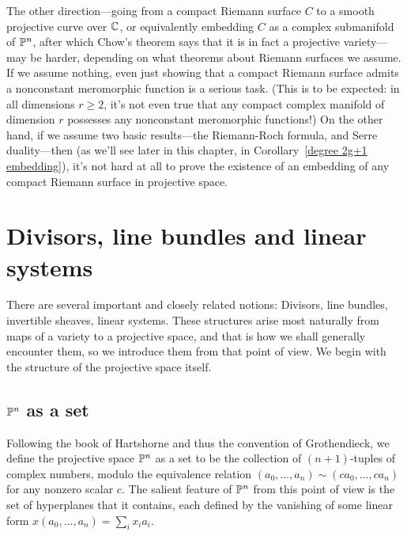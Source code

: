 
The other direction---going from a compact Riemann surface $C$ to a smooth projective curve over $\CC$, or equivalently embedding $C$ as a complex submanifold of $\PP^n$, after which Chow's theorem says that it is in fact a projective variety---may be harder, depending on what theorems about Riemann surfaces we assume. If we assume nothing, even just showing that a compact Riemann surface admits a nonconstant meromorphic function is a serious task. (This is to be expected: in all dimensions $r \geq 2$, it's not even true that any compact complex manifold of dimension $r$ possesses any nonconstant meromorphic functions!) On the other hand, if we assume  two basic results---the Riemann-Roch formula, and Serre duality---then (as we'll see later in this chapter, in Corollary~\ref{degree 2g+1 embedding}), it's not hard at all to prove the existence of an embedding of any compact Riemann surface in projective space.


\section{Divisors, line bundles and linear systems}

There are several important and closely related notions: Divisors, line bundles, invertible sheaves, linear systems. These structures arise most naturally from maps of a variety to a projective space, and that is how we shall generally encounter them, so we introduce them from that point of view. We begin with the structure of the projective space itself.

\subsection{$\PP^n$ as a set} Following the book of Hartshorne \cite[Sections *** and ***]{} and thus the convention of Grothendieck, we define the projective space $\PP^n$ as a set to be the collection of $(n+1)$-tuples of complex numbers, modulo the equivalence relation
$(a_0,\dots,a_n) \sim (ca_0,\dots, ca_n)$ for any nonzero scalar $c$. The salient feature of $\PP^n$ from this point of view is the set of hyperplanes that it contains, each defined by the vanishing of some linear form
$x(a_0,\dots,a_n) = \sum_i x_ia_i$. 

